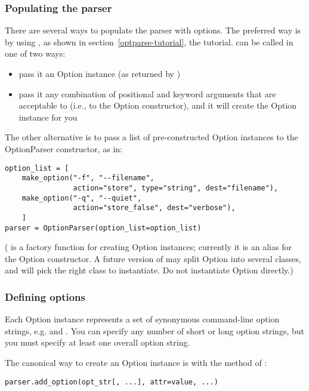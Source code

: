 \subsubsection{Populating the parser\label{optparse-populating-parser}}

There are several ways to populate the parser with options.  The
preferred way is by using , as shown in
section~\ref{optparse-tutorial}, the tutorial.   can be called in one of two
ways:
\begin{itemize}
\item {} 
pass it an Option instance (as returned by )

\item {} 
pass it any combination of positional and keyword arguments that are
acceptable to  (i.e., to the Option constructor),
and it will create the Option instance for you

\end{itemize}

The other alternative is to pass a list of pre-constructed Option
instances to the OptionParser constructor, as in:
\begin{verbatim}
option_list = [
    make_option("-f", "--filename",
                action="store", type="string", dest="filename"),
    make_option("-q", "--quiet",
                action="store_false", dest="verbose"),
    ]
parser = OptionParser(option_list=option_list)
\end{verbatim}

( is a factory function for creating Option instances;
currently it is an alias for the Option constructor.  A future version
of  may split Option into several classes, and 
will pick the right class to instantiate.  Do not instantiate Option
directly.)


\subsubsection{Defining options\label{optparse-defining-options}}

Each Option instance represents a set of synonymous command-line option
strings, e.g.  and .  You can
specify any number of short or long option strings, but you must specify
at least one overall option string.

The canonical way to create an Option instance is with the
 method of :
\begin{verbatim}
parser.add_option(opt_str[, ...], attr=value, ...)
\end{verbatim}


